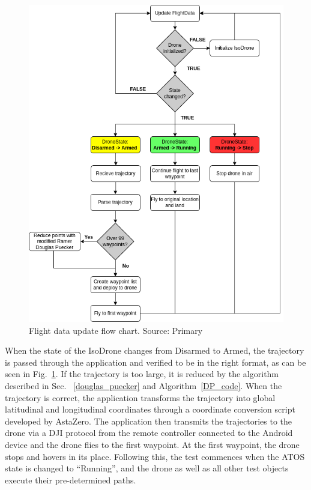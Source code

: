 \begin{figure}[H]
    \centering
    \includegraphics[scale=0.45]{figure/Flowchart-drone.png}
    \caption{Flight data update flow chart. Source: Primary}
    \label{fig:drone-flow}
\end{figure}

When the state of the IsoDrone changes from Disarmed to Armed, the trajectory is passed through the application and verified to be in the right format, as can be seen in Fig.~\ref{fig:drone-flow}. If the trajectory is too large, it is reduced by the algorithm described in Sec. ~\ref{douglas_puecker} and Algorithm~\ref{DP_code}. When the trajectory is correct, the application transforms the trajectory into global latitudinal and longitudinal coordinates through a coordinate conversion script developed by AstaZero. The application then transmits the trajectories to the drone via a DJI protocol from the remote controller connected to the Android device and the drone flies to the first waypoint. At the first waypoint, the drone stops and hovers in its place. Following this, the test commences when the ATOS state is changed to ``Running'', and the drone as well as all other test objects execute their pre-determined paths. 

